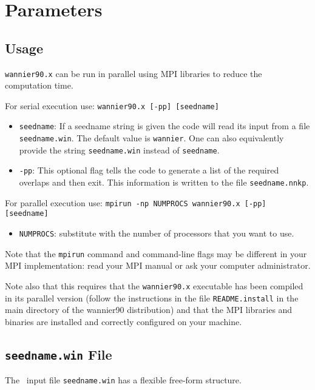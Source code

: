 \chapter{Parameters}\label{chap:parameters}

\section{Usage}
{\tt wannier90.x} can be run in parallel using MPI libraries to
reduce the computation time.

For serial execution use: {\tt wannier90.x [-pp] [seedname]}

\begin{itemize}
\item{ {\tt seedname}: If a seedname string is given the code will read its input
from a file {\tt seedname.win}. The default value is {\tt wannier}. One can also equivalently provide the string
  {\tt seedname.win} instead of  {\tt seedname}.}
\item { {\tt -pp}: This optional flag tells the code to generate
a list of the required overlaps and then exit.
This information is written to the file {\tt seedname.nnkp}.}
\end{itemize}

For parallel execution use: {\tt mpirun -np NUMPROCS wannier90.x [-pp] [seedname]}

\begin{itemize} \item
{\tt NUMPROCS}: substitute with the number of processors that you want
to use.
\end{itemize}

Note that the {\tt mpirun} command and command-line flags may be
different in your MPI implementation: read your MPI manual or ask your
computer administrator.

Note also that this requires that the {\tt wannier90.x} executable has been
compiled in its parallel version (follow the instructions in the file
{\tt README.install} in the main directory of the wannier90
distribution) and
that the MPI libraries and binaries are installed and correctly
configured on your machine.


\section{{\tt seedname.win} File\label{sec:seednamefile}}
The \wannier\ input file {\tt seedname.win} has a flexible free-form
structure.


